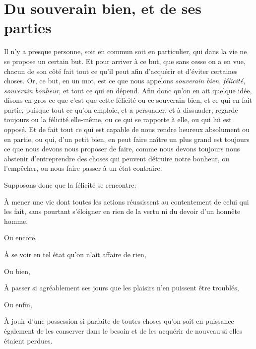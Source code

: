 
\section{Du souverain bien, et de ses parties}

Il n'y a presque personne, soit en commun soit en particulier, qui dans la vie ne se propose un certain
but. Et pour arriver à ce but, que sans cesse on a en vue, chacun de son côté fait tout ce qu'il peut afin
d'acquérir et d'éviter certaines choses. Or, ce but, en un mot, est ce que nous appelons \emph{souverain
bien}, \emph{félicité}, \emph{souverain bonheur}, et tout ce qui en dépend. Afin donc qu'on en ait quelque
idée, disons en gros ce que c'est que cette félicité ou ce souverain bien, et ce qui en fait partie, puisque
tout ce qu'on emploie, et a persuader, et à dissuader, regarde toujours ou la félicité elle-même, ou ce qui
se rapporte à elle, ou qui lui est opposé. Et de fait tout ce qui est capable de nous rendre heureux absolument
ou en partie, ou qui, d'un petit bien, en peut faire naître un plus grand est toujours ce que nous devons nous
proposer de faire, comme nous devons toujours nous abstenir d'entreprendre des choses qui peuvent détruire
notre bonheur, ou l'empêcher, ou nous faire passer à un état contraire. 

Supposons donc que la félicité se rencontre:

\begin{emphpar}
     À mener une vie dont toutes les actions réussissent au contentement de celui qui les fait, sans pourtant
	 s'éloigner en rien de la vertu ni du devoir d'un honnête homme,
\end{emphpar}

Ou encore, 

\begin{emphpar}
     À se voir en tel état qu'on n'ait affaire de rien,
\end{emphpar}

Ou bien,

\begin{emphpar}
     À passer si agréablement ses jours que les plaisirs n'en puissent être troublés,
\end{emphpar}

Ou enfin,

\begin{emphpar}
     À jouir d'une possession si parfaite de toutes choses qu'on soit en puissance également de les conserver
	 dans le besoin et de les acquérir de nouveau si elles étaient perdues.
\end{emphpar}

